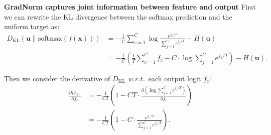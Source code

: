 \documentclass{article}
\makeatletter
\def\*#1{\mathbf{#1}}
\DeclareRobustCommand\onedot{\futurelet\@let@token\@onedot}
\def\@onedot{\ifx\@let@token.\else.\null\fi\xspace}
\def\wrt{\emph{w.r.t}\onedot} \def\dof{d.o.f\onedot}
\makeatother
\begin{document}
\textbf{{GradNorm} captures joint information between feature and output} First we can rewrite the KL divergence between the softmax prediction and the uniform target as:
\begin{align*}
        D_\text{KL} (\*u \lVert \text{softmax}(f(\*x))) & = - \frac{1}{C}\sum_{c=1}^C \log{ \frac{e^{{f_c} / T}}{\sum_{j=1}^C e^{{f_{j}} / T}}} - H(\*u)  \\&= - \frac{1}{C} \left( \frac{1}{T}\sum_{c=1}^C f_c - C \cdot \log{{\sum_{j=1}^C e^{{f_{j}} / T}}} \right) - H(\*u).
\end{align*}

Then we consider the derivative of $D_\text{KL}$ \wrt each output logit $f_c$:
\begin{align*}
        \frac{\partial D_\text{KL}}{\partial f_c}
       & = -\frac{1}{CT} \left( 1 - CT \cdot \frac{\partial \left( \log{{\sum_{j=1}^C e^{{f_{j}} / T}}}\right)}{\partial f_c} \right) \\
    &    = -\frac{1}{CT} \left( 1 - C \cdot \frac{e^{f_c / T}}{\sum_{j=1}^C e^{{f_{j}} / T}} \right).
\end{align*}
\end{document}
